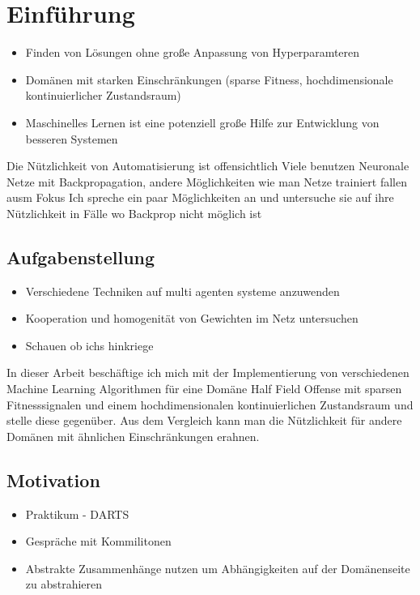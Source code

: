 \chapter{Einführung}

\begin{itemize}
    \item Finden von Lösungen ohne große Anpassung von Hyperparamteren
    \item Domänen mit starken Einschränkungen (sparse Fitness, hochdimensionale kontinuierlicher Zustandsraum)
    \item Maschinelles Lernen ist eine potenziell große Hilfe zur Entwicklung von besseren Systemen
\end{itemize}

Die Nützlichkeit von Automatisierung ist offensichtlich
Viele benutzen Neuronale Netze mit Backpropagation, andere Möglichkeiten wie man Netze trainiert fallen ausm Fokus
Ich spreche ein paar Möglichkeiten an und untersuche sie auf ihre Nützlichkeit in Fälle wo Backprop nicht möglich ist


\section{Aufgabenstellung}
\begin{itemize}
    \item Verschiedene Techniken auf multi agenten systeme anzuwenden
    \item Kooperation und homogenität von Gewichten im Netz untersuchen
    \item Schauen ob ichs hinkriege
\end{itemize}

In dieser Arbeit beschäftige ich mich mit der Implementierung von verschiedenen Machine Learning Algorithmen für eine Domäne Half Field Offense mit sparsen Fitnesssignalen und einem hochdimensionalen kontinuierlichen Zustandsraum und stelle diese gegenüber. Aus dem Vergleich kann man die Nützlichkeit für andere Domänen mit ähnlichen Einschränkungen erahnen. 

\section{Motivation}
\begin{itemize}
    \item Praktikum - DARTS
    \item Gespräche mit Kommilitonen
    \item Abstrakte Zusammenhänge nutzen um Abhängigkeiten auf der Domänenseite zu abstrahieren
\end{itemize}


